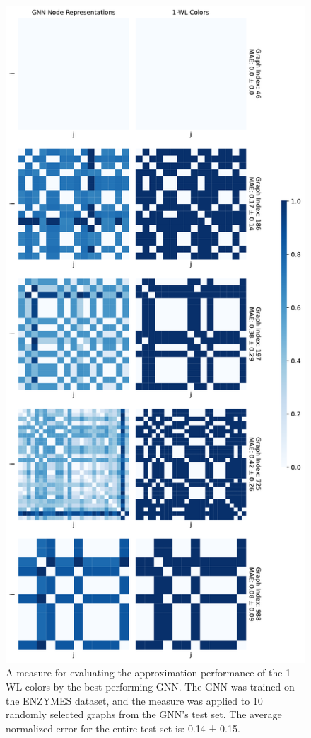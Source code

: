 \begin{figure}[!ht]
\begin{minipage}[b]{0.45992852703\textwidth}
    \end{minipage}
    \hfill
    \begin{minipage}[b]{0.53007147296\textwidth}
        \includegraphics[width=\textwidth, right]{Figures/heatmaps_IMDB-BINARY_1.pdf}
    \end{minipage}
    \hfill
    \caption{A measure for evaluating the approximation performance of the 1-WL colors by the best performing GNN. The GNN was trained on the ENZYMES dataset, and the measure was applied to 10 randomly selected graphs from the GNN's test set. The average normalized error for the entire test set is: 0.14 ± 0.15.}
\end{figure}

